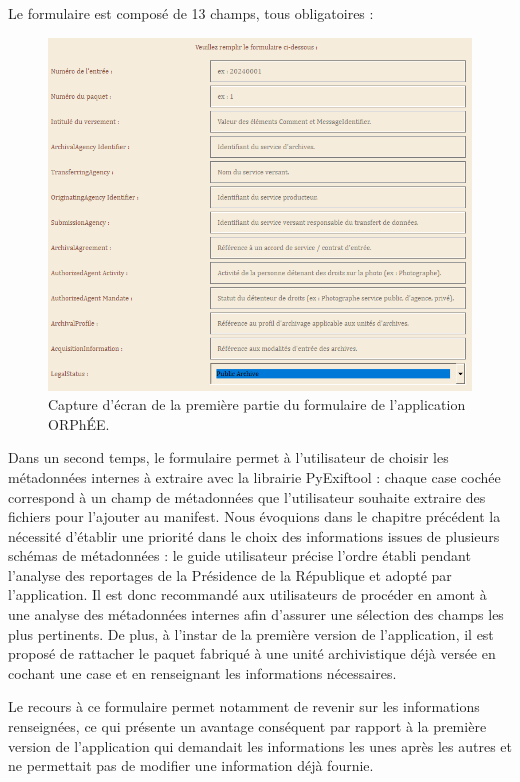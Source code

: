 Le formulaire est composé de 13 champs, tous obligatoires : 
\begin{figure}[h]
\includegraphics[width=\textwidth]{./img/orphee_formulaire_1.png}
\caption{Capture d'écran de la première partie du formulaire de l'application ORPhÉE.}
\end{figure}

Dans un second temps, le formulaire permet à l'utilisateur de choisir les métadonnées internes à extraire avec la librairie PyExiftool : chaque case cochée correspond à un champ de métadonnées que l’utilisateur souhaite extraire des fichiers pour l’ajouter au manifest. Nous évoquions dans le chapitre précédent la nécessité d'établir une priorité dans le choix des informations issues de plusieurs schémas de métadonnées : le guide utilisateur précise l'ordre établi pendant l'analyse des reportages de la Présidence de la République et adopté par l'application. Il est donc recommandé aux utilisateurs de procéder en amont à une analyse des métadonnées internes afin d'assurer une sélection des champs les plus pertinents. De plus, à l'instar de la première version de l'application, il est proposé de rattacher le paquet fabriqué à une unité archivistique déjà versée en cochant une case et en renseignant les informations nécessaires.

Le recours à ce formulaire permet notamment de revenir sur les informations renseignées, ce qui présente un avantage conséquent par rapport à la première version de l'application qui demandait les informations les unes après les autres et ne permettait pas de modifier une information déjà fournie.


